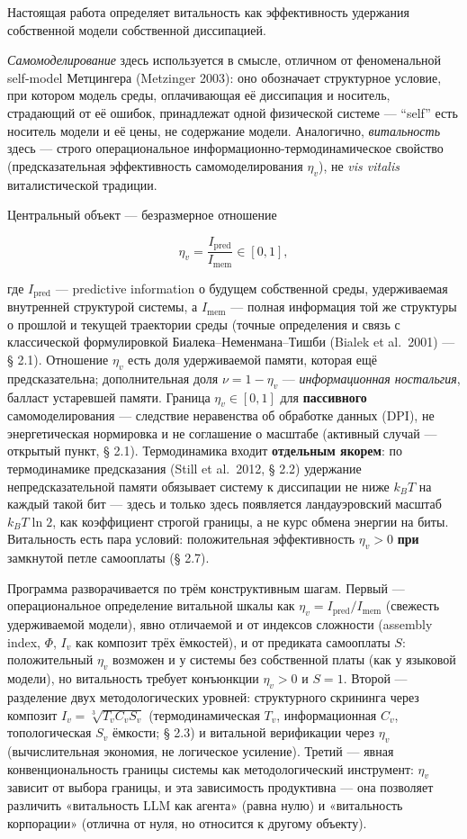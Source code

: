 \documentclass[pdflatex,sn-mathphys-ay]{sn-jnl}
\begin{document}
Настоящая работа определяет витальность как эффективность удержания собственной модели собственной диссипацией.

\emph{Самомоделирование} здесь используется в смысле, отличном от феноменальной self-model Метцингера (Metzinger 2003): оно обозначает структурное условие, при котором модель среды, оплачивающая её диссипация и носитель, страдающий от её ошибок, принадлежат одной физической системе --- ``self'' есть носитель модели и её цены, не содержание модели. Аналогично, \emph{витальность} здесь --- строго операциональное информационно-термодинамическое свойство (предсказательная эффективность самомоделирования \(\eta_v\)), не \emph{vis vitalis} виталистической традиции.

Центральный объект --- безразмерное отношение

\[\eta_v = \frac{I_{\text{pred}}}{I_{\text{mem}}} \in [0, 1],\]

где \(I_{\text{pred}}\) --- predictive information о будущем собственной среды, удерживаемая внутренней структурой системы, а \(I_{\text{mem}}\) --- полная информация той же структуры о прошлой и текущей траектории среды (точные определения и связь с классической формулировкой Биалека--Неменмана--Тишби (Bialek et al.~2001) --- § 2.1). Отношение \(\eta_v\) есть доля удерживаемой памяти, которая ещё предсказательна; дополнительная доля \(\nu = 1 - \eta_v\) --- \emph{информационная ностальгия}, балласт устаревшей памяти. Граница \(\eta_v \in [0, 1]\) для \textbf{пассивного} самомоделирования --- следствие неравенства об обработке данных (DPI), не энергетическая нормировка и не соглашение о масштабе (активный случай --- открытый пункт, § 2.1). Термодинамика входит \textbf{отдельным якорем}: по термодинамике предсказания (Still et al.~2012, § 2.2) удержание непредсказательной памяти обязывает систему к диссипации не ниже \(k_B T\) на каждый такой бит --- здесь и только здесь появляется ландауэровский масштаб \(k_B T \ln 2\), как коэффициент строгой границы, а не курс обмена энергии на биты. Витальность есть пара условий: положительная эффективность \(\eta_v > 0\) \textbf{при} замкнутой петле самооплаты (§ 2.7).

Программа разворачивается по трём конструктивным шагам. Первый --- операциональное определение витальной шкалы как \(\eta_v = I_{\text{pred}}/I_{\text{mem}}\) (свежесть удерживаемой модели), явно отличаемой и от индексов сложности (assembly index, \(\Phi\), \(I_v\) как композит трёх ёмкостей), и от предиката самооплаты \(S\): положительный \(\eta_v\) возможен и у системы без собственной платы (как у языковой модели), но витальность требует конъюнкции \(\eta_v > 0\) и \(S = 1\). Второй --- разделение двух методологических уровней: структурного скрининга через композит \(I_v = \sqrt[3]{T_v C_v S_v}\) (термодинамическая \(T_v\), информационная \(C_v\), топологическая \(S_v\) ёмкости; § 2.3) и витальной верификации через \(\eta_v\) (вычислительная экономия, не логическое усиление). Третий --- явная конвенциональность границы системы как методологический инструмент: \(\eta_v\) зависит от выбора границы, и эта зависимость продуктивна --- она позволяет различить «витальность LLM как агента» (равна нулю) и «витальность корпорации» (отлична от нуля, но относится к другому объекту).
\end{document}

